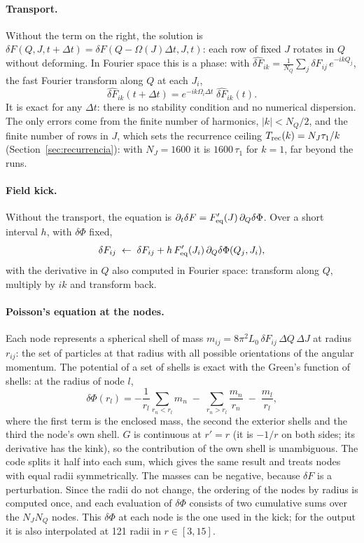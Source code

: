 \documentclass[11pt,a4paper]{article}
\begin{document}
\paragraph{Transport.} Without the term on the right, the solution is
$\delta F(Q,J,t+\Delta t)=\delta F(Q-\Omega(J)\Delta t,J,t)$: each row of fixed $J$ rotates in $Q$ without
deforming. In Fourier space this is a phase: with
$\widehat{\delta F}_{ik}=\frac{1}{N_Q}\sum_j\delta F_{ij}\,e^{-ikQ_j}$, the fast Fourier transform along
$Q$ at each $J_i$,
\[
  \widehat{\delta F}_{ik}(t+\Delta t) = e^{-ik\Omega_i\Delta t}\;\widehat{\delta F}_{ik}(t).
\]
It is exact for any $\Delta t$: there is no stability condition and no numerical
dispersion. The only errors come from the finite number of harmonics, $|k|<N_Q/2$, and the
finite number of rows in $J$, which sets the recurrence ceiling
$T_{\rm rec}(k)=N_J\tau_1/k$ (Section~\ref{sec:recurrencia}): with $N_J=1600$ it is $1600\,\tau_1$ for
$k=1$, far beyond the runs.

\paragraph{Field kick.} Without the transport, the equation is
$\partial_t\delta F=F_{\rm eq}'(J)\,\partial_Q\delta\Phi$. Over a short interval $h$, with $\delta\Phi$ fixed,
\[
  \delta F_{ij} \;\leftarrow\; \delta F_{ij} + h\,F_{\rm eq}'(J_i)\,\partial_Q\delta\Phi(Q_j,J_i),
\]
with the derivative in $Q$ also computed in Fourier space: transform along $Q$, multiply
by $ik$ and transform back.

\paragraph{Poisson's equation at the nodes.} Each node represents a spherical shell of
mass $m_{ij}=8\pi^2L_0\,\delta F_{ij}\,\Delta Q\,\Delta J$ at radius $r_{ij}$: the set of particles at that
radius with all possible orientations of the angular momentum. The potential of a set of
shells is exact with the Green's function of shells: at the radius of node $l$,
\[
  \delta\Phi(r_l) = -\frac{1}{r_l}\sum_{r_n<r_l}m_n \;-\; \sum_{r_n>r_l}\frac{m_n}{r_n}
  \;-\;\frac{m_l}{r_l},
\]
where the first term is the enclosed mass, the second the exterior shells and the third
the node's own shell. $G$ is continuous at $r'=r$ (it is $-1/r$ on both sides; its
derivative has the kink), so the contribution of the own shell is unambiguous. The code
splits it half into each sum, which gives the same result and treats nodes with equal
radii symmetrically. The masses can be negative, because $\delta F$ is a perturbation. Since
the radii do not change, the ordering of the nodes by radius is computed once, and each
evaluation of $\delta\Phi$ consists of two cumulative sums over the $N_JN_Q$ nodes. This $\delta\Phi$
at each node is the one used in the kick; for the output it is also interpolated at 121
radii in $r\in[3,15]$.
\end{document}
